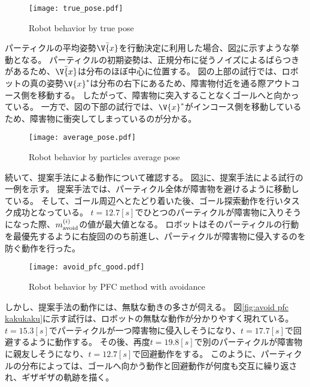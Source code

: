 \begin{figure}[H]
  \begin{center}
    \texttt{[image: true\_pose.pdf]}
    \caption{Robot behavior by true pose}
    \label{fig:true pose}
  \end{center}
\end{figure}

パーティクルの平均姿勢$\bar{\V{x}}$を行動決定に利用した場合、図\ref{fig:average pose}に示すような挙動となる。
パーティクルの初期姿勢は、正規分布に従うノイズによるばらつきがあるため、$\bar{\V{x}}$は分布のほぼ中心に位置する。
図の上部の試行では、ロボットの真の姿勢$\V{x}^{*}$は分布の右下にあるため、障害物付近を通る際アウトコース側を移動する。
したがって、障害物に突入することなくゴールへと向かっている。
一方で、図の下部の試行では、$\V{x}^{*}$がインコース側を移動しているため、障害物に衝突してしまっているのが分かる。

\begin{figure}[H]
  \begin{center}
    \texttt{[image: average\_pose.pdf]}
    \caption{Robot behavior by particles average pose}
    \label{fig:average pose}
  \end{center}
\end{figure}

続いて、提案手法による動作について確認する。
図\ref{fig:avoid pfc good}に、提案手法による試行の一例を示す。
提案手法では、パーティクル全体が障害物を避けるように移動している。
そして、ゴール周辺へとたどり着いた後、ゴール探索動作を行いタスク成功となっている。
$t=12.7[\si{s}]$でひとつのパーティクルが障害物に入りそうになった際、$m^{(i)}_{\rm avoid}$の値が最大値となる。
ロボットはそのパーティクルの行動を最優先するように右旋回ののち前進し、パーティクルが障害物に侵入するのを防ぐ動作を行った。

\begin{figure}[H]
  \begin{center}
    \texttt{[image: avoid\_pfc\_good.pdf]}
    \caption{Robot behavior by PFC method with avoidance}
    \label{fig:avoid pfc good}
  \end{center}
\end{figure}

しかし、提案手法の動作には、無駄な動きの多さが伺える。
図\ref{fig:avoid pfc kakukaku}に示す試行は、ロボットの無駄な動作が分かりやすく現れている。
$t=15.3[\si{s}]$でパーティクルが一つ障害物に侵入しそうになり、$t=17.7[\si{s}]$で回避するように動作する。
その後、再度$t=19.8[\si{s}]$で別のパーティクルが障害物に親友しそうになり、$t=12.7[\si{s}]$で回避動作をする。
このように、パーティクルの分布によっては、ゴールへ向かう動作と回避動作が何度も交互に繰り返され、ギザギザの軌跡を描く。

